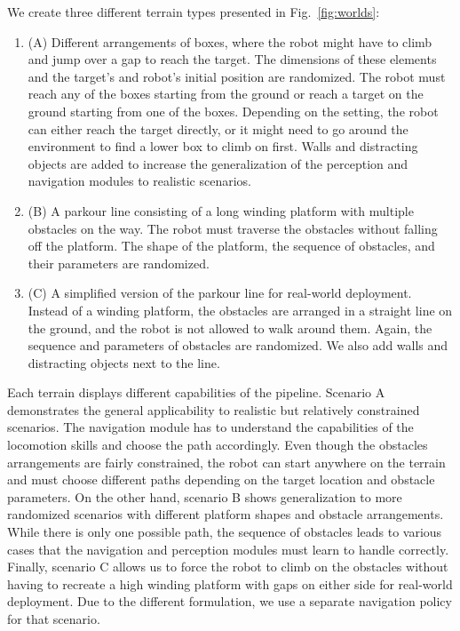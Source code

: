 \documentclass[conference]{IEEEtran}
\begin{document}
We create three different terrain types presented in Fig.~\ref{fig:worlds}:
\begin{enumerate}
  \item (A) Different arrangements of boxes, where the robot might have to climb and jump over a gap to reach the target. The dimensions of these elements and the target's and robot's initial position are randomized. The robot must reach any of the boxes starting from the ground or reach a target on the ground starting from one of the boxes. Depending on the setting, the robot can either reach the target directly, or it might need to go around the environment to find a lower box to climb on first. Walls and distracting objects are added to increase the generalization of the perception and navigation modules to realistic scenarios.

%
\item (B) A parkour line consisting of a long winding platform with multiple obstacles on the way. The robot must traverse the obstacles without falling off the platform. The shape of the platform, the sequence of obstacles, and their parameters are randomized.
%
\item (C) A simplified version of the parkour line for real-world deployment. Instead of a winding platform, the obstacles are arranged in a straight line on the ground, and the robot is not allowed to walk around them. Again, the sequence and parameters of obstacles are randomized. We also add walls and distracting objects next to the line.
\end{enumerate}

Each terrain displays different capabilities of the pipeline. Scenario A demonstrates the general applicability to realistic but relatively constrained scenarios. The navigation module has to understand the capabilities of the locomotion skills and choose the path accordingly. Even though the obstacles arrangements are fairly constrained, the robot can start anywhere on the terrain and must choose different paths depending on the target location and obstacle parameters.
On the other hand, scenario B shows generalization to more randomized scenarios with different platform shapes and obstacle arrangements. While there is only one possible path, the sequence of obstacles leads to various cases that the navigation and perception modules must learn to handle correctly. Finally, scenario C allows us to force the robot to climb on the obstacles without having to recreate a high winding platform with gaps on either side for real-world deployment. Due to the different formulation, we use a separate navigation policy for that scenario.
\end{document}
